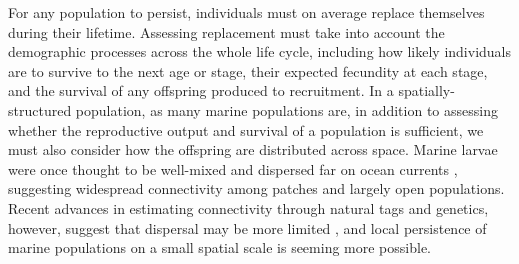 \documentclass[12pt, oneside]{article}   	%
\begin{document}
For any population to persist, individuals must on average replace themselves during their lifetime. Assessing replacement must take into account the demographic processes across the whole life cycle, including how likely individuals are to survive to the next age or stage, their expected fecundity at each stage, and the survival of any offspring produced to recruitment. In a spatially-structured population, as many marine populations are, in addition to assessing whether the reproductive output and survival of a population is sufficient, we must also consider how the offspring are distributed across space. Marine larvae were once thought to be well-mixed and dispersed far on ocean currents \citep[e.g.][]{roughgarden_recruitment_1988}, suggesting widespread connectivity among patches and largely open populations. Recent advances in estimating connectivity through natural tags and genetics, however, suggest that dispersal may be more limited \citep[e.g.][]{daloia_self-recruitment_2013, hameed2016inverse, almany2017larval}, and local persistence of marine populations on a small spatial scale is seeming more possible.  %


\end{document}
